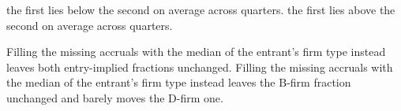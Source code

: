 

the first lies  below the second on average across quarters.
the first lies  above the second on average across quarters.

Filling the missing accruals with the median of the entrant's firm type instead leaves both entry-implied fractions unchanged.
Filling the missing accruals with the median of the entrant's firm type instead leaves the $\mathrm{B}$-firm fraction unchanged and barely moves the $\mathrm{D}$-firm one.

